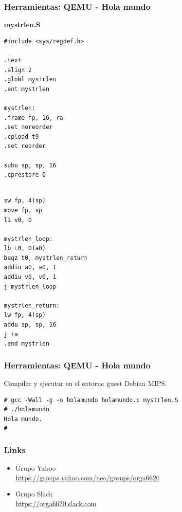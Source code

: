 \documentclass{beamer}
\begin{document}
  \begin{frame}[fragile]
 \frametitle{Herramientas: QEMU - Hola mundo}
 \textbf{mystrlen.S}

\begin{multicols}{2}
\begin{lstlisting}
#include <sys/regdef.h>

.text
.align 2
.globl mystrlen
.ent mystrlen

mystrlen:
.frame fp, 16, ra
.set noreorder
.cpload t9
.set reorder

subu sp, sp, 16
.cprestore 0


\end{lstlisting}

\columnbreak
\begin{lstlisting}
sw fp, 4(sp)
move fp, sp
li v0, 0

mystrlen_loop:
lb t0, 0(a0)
beqz t0, mystrlen_return
addiu a0, a0, 1
addiu v0, v0, 1
j mystrlen_loop

mystrlen_return:
lw fp, 4(sp)
addu sp, sp, 16
j ra
.end mystrlen
\end{lstlisting}
\end{multicols}
\end{frame}

  \begin{frame}[fragile]
 \frametitle{Herramientas: QEMU - Hola mundo} 
Compilar y ejecutar en el entorno guest Debian MIPS.

\begin{lstlisting}
# gcc -Wall -g -o holamundo holamundo.c mystrlen.S 
# ./holamundo 
Hola mundo.
# 
\end{lstlisting}
\end{frame}

  
   \begin{frame}
 \frametitle{Links}
 \begin{itemize}
\item Grupo Yahoo \\ \url{https://groups.yahoo.com/neo/groups/orga6620}
\item Grupo Slack \\ \url{https://orga6620.slack.com}
 \end{itemize}
 \end{frame}
\end{document}
